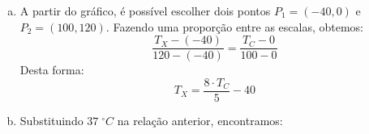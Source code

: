 %
%
	\noindent
\begin{enumerate}[a)]
	\item A partir do gráfico, é possível escolher dois pontos $P_{1}=(-40,0)$ e $P_{2}=(100,120)$. Fazendo uma proporção entre as escalas, obtemos:
	\[\dfrac{T_{X}-(-40)}{120-(-40)} = \dfrac{T_{C}-0}{100-0}\]
	Desta forma:
	\[\boxed{T_{X}=\dfrac{8 \cdot T_{C}}{5} - 40}\]
	\item Substituindo $37\;^\circ C$ na relação anterior, encontramos: 
\end{enumerate}
